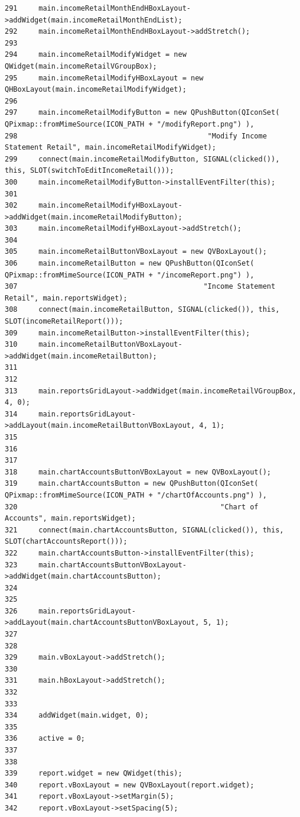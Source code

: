 \begin{verbatim}
291     main.incomeRetailMonthEndHBoxLayout->addWidget(main.incomeRetailMonthEndList);
292     main.incomeRetailMonthEndHBoxLayout->addStretch();
293     
294     main.incomeRetailModifyWidget = new QWidget(main.incomeRetailVGroupBox);
295     main.incomeRetailModifyHBoxLayout = new QHBoxLayout(main.incomeRetailModifyWidget);
296     
297     main.incomeRetailModifyButton = new QPushButton(QIconSet( QPixmap::fromMimeSource(ICON_PATH + "/modifyReport.png") ),
298                                             "Modify Income Statement Retail", main.incomeRetailModifyWidget);
299     connect(main.incomeRetailModifyButton, SIGNAL(clicked()), this, SLOT(switchToEditIncomeRetail()));
300     main.incomeRetailModifyButton->installEventFilter(this);
301     
302     main.incomeRetailModifyHBoxLayout->addWidget(main.incomeRetailModifyButton);
303     main.incomeRetailModifyHBoxLayout->addStretch();
304     
305     main.incomeRetailButtonVBoxLayout = new QVBoxLayout();
306     main.incomeRetailButton = new QPushButton(QIconSet( QPixmap::fromMimeSource(ICON_PATH + "/incomeReport.png") ),
307                                            "Income Statement Retail", main.reportsWidget);
308     connect(main.incomeRetailButton, SIGNAL(clicked()), this, SLOT(incomeRetailReport()));
309     main.incomeRetailButton->installEventFilter(this);
310     main.incomeRetailButtonVBoxLayout->addWidget(main.incomeRetailButton);
311     
312     
313     main.reportsGridLayout->addWidget(main.incomeRetailVGroupBox, 4, 0);
314     main.reportsGridLayout->addLayout(main.incomeRetailButtonVBoxLayout, 4, 1);
315 
316 
317 
318     main.chartAccountsButtonVBoxLayout = new QVBoxLayout();
319     main.chartAccountsButton = new QPushButton(QIconSet( QPixmap::fromMimeSource(ICON_PATH + "/chartOfAccounts.png") ),
320                                                "Chart of Accounts", main.reportsWidget);
321     connect(main.chartAccountsButton, SIGNAL(clicked()), this, SLOT(chartAccountsReport()));
322     main.chartAccountsButton->installEventFilter(this);
323     main.chartAccountsButtonVBoxLayout->addWidget(main.chartAccountsButton);
324     
325     
326     main.reportsGridLayout->addLayout(main.chartAccountsButtonVBoxLayout, 5, 1);
327     
328     
329     main.vBoxLayout->addStretch();
330     
331     main.hBoxLayout->addStretch();
332     
333     
334     addWidget(main.widget, 0);
335     
336     active = 0;
337     
338     
339     report.widget = new QWidget(this);
340     report.vBoxLayout = new QVBoxLayout(report.widget);
341     report.vBoxLayout->setMargin(5);
342     report.vBoxLayout->setSpacing(5);

\end{verbatim}
